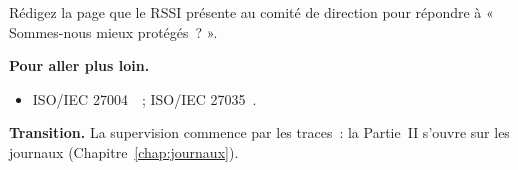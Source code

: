 \begin{boxexo}[title={\ding{45}\quad Exercice~3.10. Présentation au comité \niveauexpert}]
Rédigez la page que le RSSI présente au comité de direction pour répondre à
« Sommes-nous mieux protégés~? ».
\end{boxexo}

\bigskip

\begin{boxinfo}
\textbf{Pour aller plus loin.}
\begin{itemize}
    \item ISO/IEC 27004~\cite{iso27004}~; ISO/IEC 27035~\cite{iso27035}.
\end{itemize}
\end{boxinfo}

\begin{boxinfo}
\textbf{Transition.} La supervision commence par les traces~: la Partie~II
s'ouvre sur les journaux (Chapitre~\ref{chap:journaux}).
\end{boxinfo}
